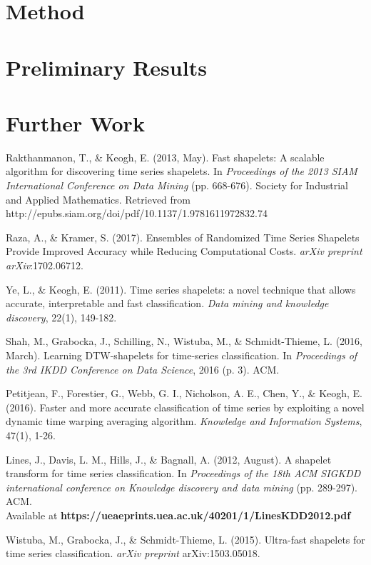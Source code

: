 \documentclass[10pt,a4paper]{article}
\begin{document}
\section{Method}

\section{Preliminary  Results}

\section{Further Work} 

\pagebreak
\begin{thebibliography}{9}

Rakthanmanon, T., \& Keogh, E. (2013, May). Fast shapelets: A scalable algorithm for discovering time series shapelets. In \textit{Proceedings of the 2013 SIAM International Conference on Data Mining} (pp. 668-676). Society for Industrial and Applied Mathematics.
Retrieved from http://epubs.siam.org/doi/pdf/10.1137/1.9781611972832.74 

Raza, A., \& Kramer, S. (2017). Ensembles of Randomized Time Series Shapelets Provide Improved Accuracy while Reducing Computational Costs. \textit{arXiv preprint arXiv}:1702.06712.

Ye, L., \& Keogh, E. (2011). Time series shapelets: a novel technique that allows accurate, interpretable and fast classification. \textit{Data mining and knowledge discovery}, 22(1), 149-182.

Shah, M., Grabocka, J., Schilling, N., Wistuba, M., \& Schmidt-Thieme, L. (2016, March). Learning DTW-shapelets for time-series classification. In \textit{Proceedings of the 3rd IKDD Conference on Data Science}, 2016 (p. 3). ACM.

Petitjean, F., Forestier, G., Webb, G. I., Nicholson, A. E., Chen, Y., \& Keogh, E. (2016). Faster and more accurate classification of time series by exploiting a novel dynamic time warping averaging algorithm. \textit{Knowledge and Information Systems}, 47(1), 1-26.

Lines, J., Davis, L. M., Hills, J., \& Bagnall, A. (2012, August). A shapelet transform for time series classification. In \textit{Proceedings of the 18th ACM SIGKDD international conference on Knowledge discovery and data mining} (pp. 289-297). ACM.\\
Available at \textbf{https://ueaeprints.uea.ac.uk/40201/1/LinesKDD2012.pdf}

Wistuba, M., Grabocka, J., \& Schmidt-Thieme, L. (2015). Ultra-fast shapelets for time series classification. \textit{arXiv preprint} arXiv:1503.05018.

\end{thebibliography}
\end{document}
